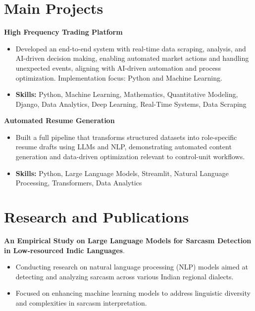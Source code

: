 \documentclass[a4paper,11pt]{article}
\begin{document}
\section{\textbf{Main Projects}}

\vspace{1mm}
  \textbf{High Frequency Trading Platform  }
\vspace{-1.5mm} %
\begin{itemize}
  \item Developed an end-to-end system with real-time data scraping, analysis, and AI-driven decision making, enabling automated market actions and handling unexpected events, aligning with AI-driven automation and process optimization. Implementation focus: Python and Machine Learning.
\vspace{-3mm}
  \item \textbf{Skills:} Python, Machine Learning, Mathematics, Quantitative Modeling, Django, Data Analytics, Deep Learning, Real-Time Systems, Data Scraping
\end{itemize}


\vspace{1mm}
   \textbf{Automated Resume Generation }
\vspace{-1.5mm} %
\begin{itemize}
  \item Built a full pipeline that transforms structured datasets into role-specific resume drafts using LLMs and NLP, demonstrating automated content generation and data-driven optimization relevant to control-unit workflows.
\vspace{-3mm}
  \item \textbf{Skills:} Python, Large Language Models, Streamlit, Natural Language Processing, Transformers, Data Analytics
\end{itemize}



\section{\textbf{Research and Publications} \hfill }
\vspace{1mm}
  \textbf{An Empirical Study on Large Language Models for Sarcasm Detection in Low-resourced Indic Languages}.
\vspace{-1mm} %
\begin{itemize}
  \item Conducting research on natural language processing (NLP) models aimed at detecting and analyzing sarcasm across various Indian regional dialects.
\vspace{-3mm}
  \item Focused on enhancing machine learning models to address linguistic diversity and complexities in sarcasm interpretation.
\end{itemize}
\end{document}
